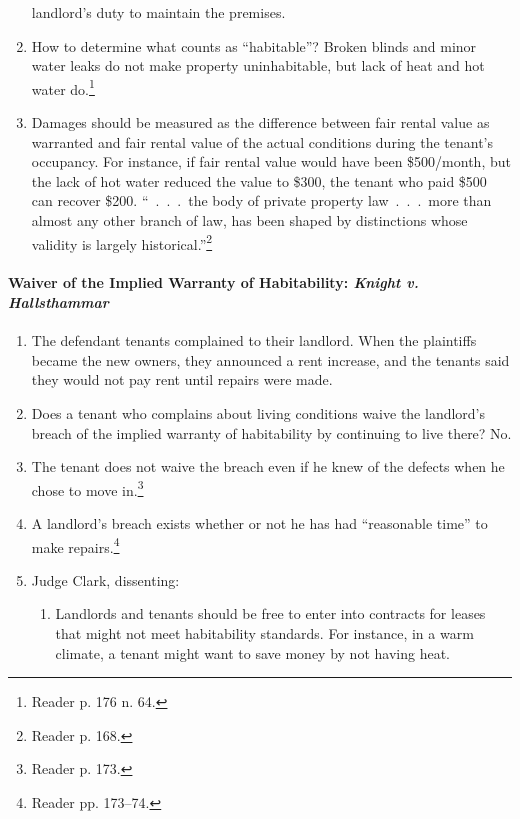 \begin{enumerate}
    landlord's duty to maintain the premises.
    \item How to determine what counts as ``habitable''? Broken blinds and 
    minor water leaks do not make property uninhabitable, but lack of heat and 
    hot water do.\footnote{Reader p. 176 n. 64.}
    \item Damages should be measured as the difference between fair rental 
    value as warranted and fair rental value of the actual conditions during 
    the tenant's occupancy. For instance, if fair rental value would have been 
    \$500/month, but the lack of hot water reduced the value to \$300, the 
    tenant who paid \$500 can recover \$200.
    ``~.~.~.~the body of private property law~.~.~.~more than almost any other 
    branch of law, has been shaped by distinctions whose validity is largely 
    historical.''\footnote{Reader p. 168.}
\end{enumerate}

\paragraph{Waiver of the Implied Warranty of Habitability: \emph{Knight v. 
Hallsthammar}}

\begin{enumerate}
    \item The defendant tenants complained to their landlord. When the 
    plaintiffs became the new owners, they announced a rent increase, and the 
    tenants said they would not pay rent until repairs were made.
    \item Does a tenant who complains about living conditions waive the 
    landlord's breach of the implied warranty of habitability by continuing to 
    live there? No.
    \item The tenant does not waive the breach even if he knew of the defects 
    when he chose to move in.\footnote{Reader p. 173.}
    \item A landlord's breach exists whether or not he has had ``reasonable 
    time'' to make repairs.\footnote{Reader pp. 173--74.}
    \item Judge Clark, dissenting:
    \begin{enumerate}
        \item Landlords and tenants should be free to enter into contracts for 
        leases that might not meet habitability standards. For instance, in a 
        warm climate, a tenant might want to save money by not having heat.
    \end{enumerate}
\end{enumerate}


